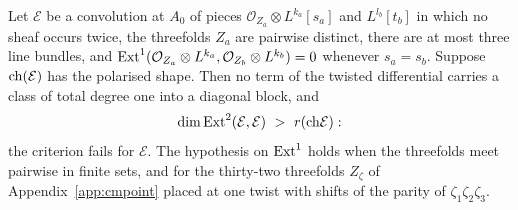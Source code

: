 \begin{proposition}\label{prop:separated}
Let $\mathcal{E}$ be a convolution at $A_{0}$ of pieces $\mathcal{O}_{Z_{a}}\otimes L^{k_{a}}[s_{a}]$ and $L^{l_{b}}[t_{b}]$ in which no sheaf occurs twice, the threefolds $Z_{a}$ are pairwise distinct, there are at most three line bundles, and $\mathrm{Ext}^{1}(\mathcal{O}_{Z_{a}}\otimes L^{k_{a}},\mathcal{O}_{Z_{b}}\otimes L^{k_{b}})=0$ whenever $s_{a}=s_{b}$. Suppose $\mathrm{ch}(\mathcal{E})$ has the polarised shape. Then no term of the twisted differential carries a class of total degree one into a diagonal block, and
\[
\dim\Ext^{2}(\mathcal{E},\mathcal{E})\ >\ r(\ch\mathcal{E}):
\]
the criterion fails for $\mathcal{E}$. The hypothesis on $\mathrm{Ext}^{1}$ holds when the threefolds meet pairwise in finite sets, and for the thirty-two threefolds $Z_{\zeta}$ of Appendix~\ref{app:cmpoint} placed at one twist with shifts of the parity of $\zeta_{1}\zeta_{2}\zeta_{3}$.
\end{proposition}

